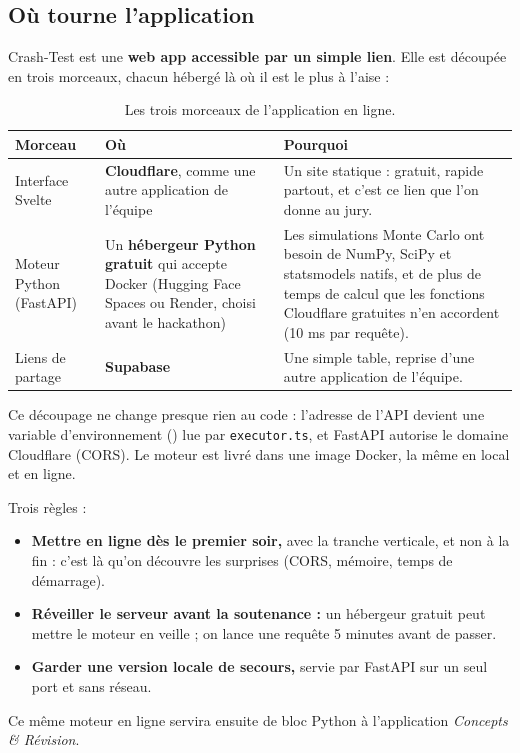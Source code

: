 \documentclass[11pt,a4paper]{article}
\begin{document}
\subsection{Où tourne l'application}
Crash-Test est une \textbf{web app accessible par un simple lien}. Elle est découpée en trois morceaux, chacun hébergé là où il est le plus à l'aise :

\begin{table}[H]
  \centering
  \small
  \begin{tabularx}{\textwidth}{@{}L{3.3cm} L{4.4cm} Y@{}}
    \toprule
    \textbf{Morceau} & \textbf{Où} & \textbf{Pourquoi} \\
    \midrule
    Interface Svelte & \textbf{Cloudflare}, comme une autre application de l'équipe & Un site statique : gratuit, rapide partout, et c'est ce lien que l'on donne au jury. \\
    Moteur Python (FastAPI) & Un \textbf{hébergeur Python gratuit} qui accepte Docker (Hugging Face Spaces ou Render, choisi avant le hackathon) & Les simulations Monte Carlo ont besoin de NumPy, SciPy et statsmodels natifs, et de plus de temps de calcul que les fonctions Cloudflare gratuites n'en accordent (10 ms par requête). \\
    Liens de partage & \textbf{Supabase} & Une simple table, reprise d'une autre application de l'équipe. \\
    \bottomrule
  \end{tabularx}
  \caption{Les trois morceaux de l'application en ligne.}
\end{table}

Ce découpage ne change presque rien au code : l'adresse de l'API devient une variable d'environnement () lue par \texttt{executor.ts}, et FastAPI autorise le domaine Cloudflare (CORS). Le moteur est livré dans une image Docker, la même en local et en ligne.

Trois règles :
\begin{itemize}[leftmargin=*, nosep]
  \item \textbf{Mettre en ligne dès le premier soir,} avec la tranche verticale, et non à la fin : c'est là qu'on découvre les surprises (CORS, mémoire, temps de démarrage).
  \item \textbf{Réveiller le serveur avant la soutenance :} un hébergeur gratuit peut mettre le moteur en veille ; on lance une requête 5 minutes avant de passer.
  \item \textbf{Garder une version locale de secours,} servie par FastAPI sur un seul port et sans réseau.
\end{itemize}
Ce même moteur en ligne servira ensuite de \og bloc Python \fg{} à l'application \emph{Concepts \& Révision}.
\end{document}
